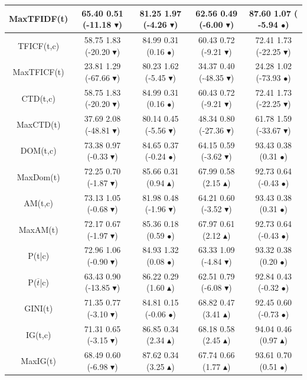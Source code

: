 \documentclass[10pt, red]{beamer}
\newcommand{\triangOK}{\textcolor[rgb]{00,0.45,0.10}{$\blacktriangle$}}
\newcommand{\triangBAD}{\textcolor[rgb]{0.7,00,00}{$\blacktriangledown$}}
\newcommand{\ball}{\textcolor[rgb]{0.7,0.70,0.0}{$\bullet$}}
\begin{document}
{\begin{table}[h]
\begin{adjustwidth}{-0.95cm}{-0.95cm}
\begin{tabular}{|c||c|c|c|c|}
\hline 
MaxTFIDF(t) & 65.40 \textpm{} 0.51 (-11.18 \triangBAD) & 81.25 \textpm{} 1.97 (-4.26 \triangBAD) & 62.56 \textpm{} 0.49 (-6.00 \triangBAD) & 87.60 \textpm{} 1.07 ( -5.94 \ball)\tabularnewline
\hline 
TFICF(t,c) & 58.75 \textpm{} 1.83 (-20.20 \triangBAD) & 84.99 \textpm{} 0.31 (0.16 \ball) & 60.43 \textpm{} 0.72 (-9.21 \triangBAD) & 72.41 \textpm{} 1.73 (-22.25 \triangBAD)\tabularnewline
\hline 
MaxTFICF(t) & 23.81 \textpm{} 1.29 (-67.66 \triangBAD) & 80.23 \textpm{} 1.62 (-5.45 \triangBAD) & 34.37 \textpm{} 0.40 (-48.35 \triangBAD) & 24.28 \textpm{} 1.02 (-73.93 \ball)\tabularnewline
\hline 
CTD(t,c) & 58.75 \textpm{} 1.83 (-20.20 \triangBAD) & 84.99 \textpm{} 0.31 (0.16 \ball) & 60.43 \textpm{} 0.72 (-9.21 \triangBAD) & 72.41 \textpm{} 1.73 (-22.25 \triangBAD)\tabularnewline
\hline 
MaxCTD(t) & 37.69 \textpm{} 2.08 (-48.81 \triangBAD) & 80.14 \textpm{} 0.45 (-5.56 \triangBAD) & 48.34 \textpm{} 0.80 (-27.36 \triangBAD) & 61.78 \textpm{} 1.59 (-33.67 \triangBAD)\tabularnewline
\hline 
DOM(t,c) & 73.38 \textpm{} 0.97 (-0.33 \triangBAD) & 84.65 \textpm{} 0.37 (-0.24 \ball) & 64.15 \textpm{} 0.59 (-3.62 \triangBAD) & 93.43 \textpm{} 0.38 (0.31 \ball)\tabularnewline
\hline 
MaxDom(t) & 72.25 \textpm{} 0.70 (-1.87 \triangBAD) & 85.66 \textpm{} 0.31 (0.94 \triangOK) & 67.99 \textpm{} 0.58 (2.15 \triangOK) & 92.73 \textpm{} 0.64 (-0.43 \ball)\tabularnewline
\hline 
AM(t,c) & 73.13 \textpm{} 1.05 (-0.68 \triangBAD) & 81.98 \textpm{} 0.48 (-1.96 \triangBAD) & 64.21 \textpm{} 0.60 (-3.52 \triangBAD) & 93.43 \textpm{} 0.38 (0.31 \ball)\tabularnewline
\hline 
MaxAM(t) & 72.17 \textpm{} 0.67 (-1.97 \triangBAD) & 85.36 \textpm{} 0.18 (0.59 \ball) & 67.97 \textpm{} 0.61 (2.12 \triangOK) & 92.73 \textpm{} 0.64 (-0.43 \ball)\tabularnewline
\hline 
P(t|c) & 72.96 \textpm{} 1.06 (-0.90 \triangBAD) & 84.93 \textpm{} 1.32 (0.08 \ball) & 63.33 \textpm{} 1.09 (-4.84 \triangBAD) & 93.32 \textpm{} 0.38 (0.20 \ball)\tabularnewline
\hline 
P($\overline{t}$|c) & 63.43 \textpm{} 0.90 (-13.85 \triangBAD) & 86.22 \textpm{} 0.29 (1.60 \triangOK) & 62.51 \textpm{} 0.79 (-6.08 \triangBAD) & 92.84 \textpm{} 0.43 (-0.32 \ball)\tabularnewline
\hline 
GINI(t) & 71.35 \textpm{} 0.77 (-3.10 \triangBAD) & 84.81 \textpm{} 0.15 (-0.06 \ball) & 68.82 \textpm{} 0.47 (3.41 \triangOK) & 92.45 \textpm{} 0.60 (-0.73 \ball) \tabularnewline
\hline 
IG(t,c) & 71.31 \textpm{} 0.65 (-3.15 \triangBAD) & 86.85 \textpm{} 0.34 (2.34 \triangOK) & 68.18 \textpm{} 0.58 (2.45 \triangOK) & 94.04 \textpm{} 0.46 (0.97 \triangOK)\tabularnewline
\hline 
MaxIG(t) & 68.49 \textpm{} 0.60 (-6.98 \triangBAD) & 87.62 \textpm{} 0.34 (3.25 \triangOK) & 67.74 \textpm{} 0.66 (1.77 \triangOK) & 93.61 \textpm{} 0.70 (0.51 \ball)\tabularnewline

\end{tabular}
\end{adjustwidth}
\end{table}}
\end{document}

